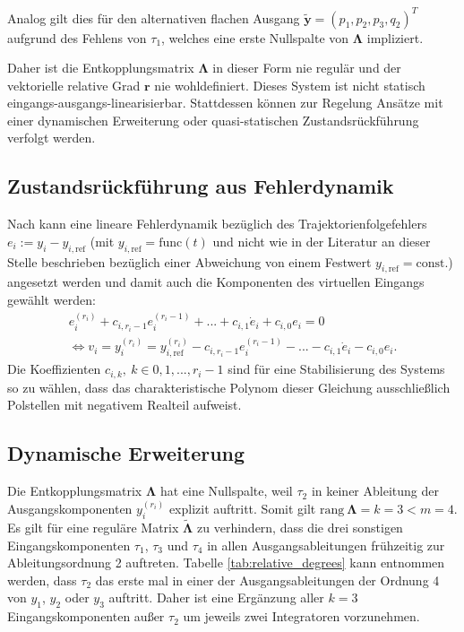 Analog gilt dies für den alternativen flachen Ausgang $\tilde{\mathbf{y}} = (p_1, p_2, p_3, q_2)^T$ aufgrund des Fehlens von $\tau_1$, welches eine erste Nullspalte von $\boldsymbol{\Lambda}$ impliziert.

Daher ist die Entkopplungsmatrix $\boldsymbol{\Lambda}$ in dieser Form nie regulär und der vektorielle relative Grad $\mathbf{r}$ nie wohldefiniert. Dieses System ist nicht statisch eingangs-ausgangs-linearisierbar. Stattdessen können zur Regelung Ansätze mit einer dynamischen Erweiterung oder quasi-statischen Zustandsrückführung verfolgt werden. 

\subsection{Zustandsrückführung aus Fehlerdynamik}
\label{sec:error_dynamics}
Nach \cite[S. 195]{NLRT_Roebenack} kann eine lineare Fehlerdynamik bezüglich des Trajektorienfolgefehlers $e_i := y_i - y_{i, \text{ref}}$ (mit $y_{i, \text{ref}} = \mathrm{func}(t)$ und nicht wie in der Literatur an dieser Stelle beschrieben bezüglich einer Abweichung von einem Festwert $y_{i, \text{ref}} = \mathrm{const.}$) angesetzt werden und damit auch die Komponenten des virtuellen Eingangs gewählt werden:
\begin{align}
	e_i^{(r_i)} + c_{i, r_i-1} e_i^{(r_i-1)} + ... + c_{i, 1} \dot{e}_i + c_{i, 0} e_i = 0 
	\\
	\Leftrightarrow v_i = y_i^{(r_i)} = y_{i, \text{ref}}^{(r_i)} - c_{i, r_i-1} e_i^{(r_i-1)} - ... - c_{i, 1} \dot{e}_i - c_{i, 0} e_i.
\end{align}
Die Koeffizienten $c_{i, k}, \ k \in {0, 1, ..., r_i-1}$ sind für eine Stabilisierung des Systems so zu wählen, dass das charakteristische Polynom dieser Gleichung ausschließlich Polstellen mit negativem Realteil aufweist.

\subsection{Dynamische Erweiterung}
Die Entkopplungsmatrix $\boldsymbol{\Lambda}$ hat eine Nullspalte, weil $\tau_2$ in keiner Ableitung der Ausgangskomponenten $y_i^{(r_i)}$ explizit auftritt. Somit gilt $\text{rang} \ \boldsymbol{\Lambda} = k = 3 < m = 4$. Es gilt für eine reguläre Matrix $\tilde{\boldsymbol{\Lambda}}$ zu verhindern, dass die drei sonstigen Eingangskomponenten $\tau_1$, $\tau_3$ und $\tau_4$ in allen Ausgangsableitungen frühzeitig zur Ableitungsordnung 2 auftreten. Tabelle \ref{tab:relative_degrees} kann entnommen werden, dass $\tau_{2}$ das erste mal in einer der Ausgangsableitungen der Ordnung 4 von $y_1$, $y_2$ oder $y_3$ auftritt. Daher ist eine Ergänzung aller $k = 3$ Eingangskomponenten außer $\tau_2$ um jeweils zwei Integratoren vorzunehmen. \cite[S. 200]{NLRT_Roebenack}

